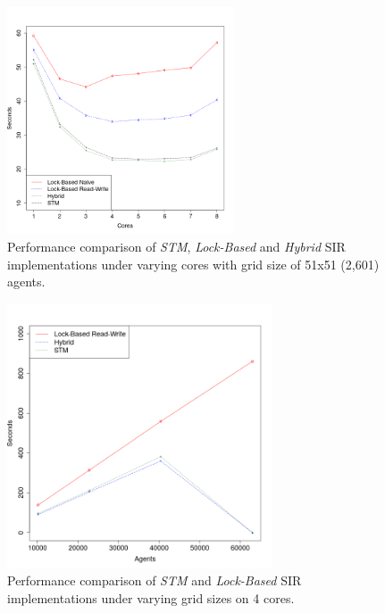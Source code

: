 \documentclass{bmcart}
\begin{document}
\begin{backmatter}
\begin{figure}[h!]
	\includegraphics[width=0.6\textwidth, angle=0]{./sir_varyingcores_constgrid.png}
	\caption{Performance comparison of \textit{STM}, \textit{Lock-Based} and \textit{Hybrid} SIR implementations under varying cores with grid size of 51x51 (2,601) agents.}
	\label{fig:sir_varyingcores_constgrid}
\end{figure}

\begin{figure}[h!]
	\centering
	\includegraphics[width=0.7\textwidth, angle=0]{./sir_varyinggrid_constcores.png}
	\caption{Performance comparison of \textit{STM} and \textit{Lock-Based} SIR implementations under varying grid sizes on 4 cores.}
	\label{fig:sir_varyinggrid_constcores}
\end{figure}


\end{backmatter}
\end{document}
